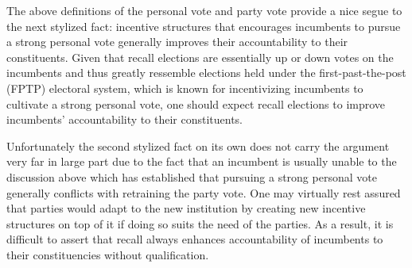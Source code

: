 \documentclass[hyphens, crop=false]{standalone}
\begin{document}
	
	The above definitions of the personal vote and party vote provide a nice segue
	to the next stylized fact:
	incentive structures that encourages incumbents to pursue a strong personal vote
	generally improves their accountability to their constituents.
	Given that recall elections are essentially
	up or down votes on the incumbents
	and thus greatly ressemble elections held under the
	first-past-the-post (FPTP) electoral system,
	which is known for incentivizing incumbents to cultivate a strong personal vote,
	one should expect recall elections
	to improve incumbents' accountability to their constituents.
	
	Unfortunately the second stylized fact on its own does not carry the argument very far
	in large part due to the fact that an incumbent is usually
	unable to the discussion above which has established that
	pursuing a strong personal vote generally conflicts with
	retraining the party vote.
	One may virtually rest assured that parties would adapt to
	the new institution by creating new incentive structures on top of it
	if doing so suits the need of the parties.
	As a result,
	it is difficult to assert that recall
	always enhances accountability of incumbents to their constituencies
	without qualification.
	
	
	
	
\end{document}
